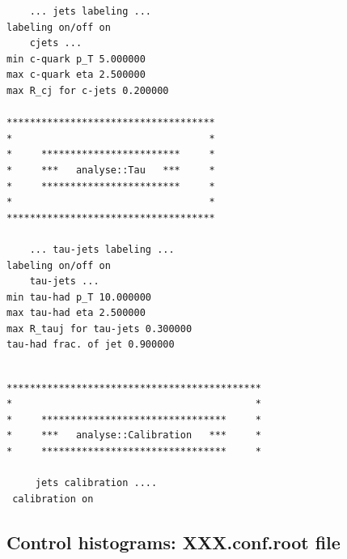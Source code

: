 {\begin{verbatim}
	... jets labeling ...
labeling on/off on
	cjets ...
min c-quark p_T 5.000000
max c-quark eta 2.500000
max R_cj for c-jets 0.200000

************************************
*                                  *
*     ************************     *
*     ***   analyse::Tau   ***     *
*     ************************     *
*                                  *
************************************

	... tau-jets labeling ...
labeling on/off on
	tau-jets ...
min tau-had p_T 10.000000
max tau-had eta 2.500000
max R_tauj for tau-jets 0.300000
tau-had frac. of jet 0.900000

\end{verbatim}
\newpage
\begin{verbatim}

********************************************
*                                          *
*     ********************************     *
*     ***   analyse::Calibration   ***     *
*     ********************************     *

	 jets calibration ....
 calibration on
\end{verbatim}  
}

\subsection{Control histograms: XXX.conf.root  file}

